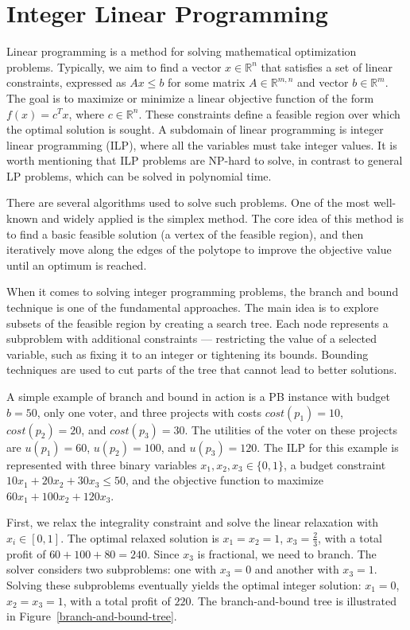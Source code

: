 \documentclass[magisterska,en]{pracamgr}
\begin{document}
\section{Integer Linear Programming}

Linear programming is a method for solving mathematical optimization problems. Typically, we aim to find a vector $x\in\mathbb{R}^n$ that satisfies a set of linear constraints, expressed as $Ax\leq b$ for some matrix $A\in\mathbb{R}^{m,n}$ and vector $b\in\mathbb{R}^m$. The goal is to maximize or minimize a linear objective function of the form $f(x)=c^Tx$, where $c\in\mathbb{R}^n$. These constraints define a feasible region over which the optimal solution is sought. A subdomain of linear programming is integer linear programming (ILP), where all the variables must take integer values. It is worth mentioning that ILP problems are NP-hard to solve, in contrast to general LP problems, which can be solved in polynomial time.

There are several algorithms used to solve such problems. One of the most well-known and widely applied is the simplex method. The core idea of this method is to find a basic feasible solution (a vertex of the feasible region), and then iteratively move along the edges of the polytope to improve the objective value until an optimum is reached.

When it comes to solving integer programming problems, the branch and bound technique is one of the fundamental approaches. The main idea is to explore subsets of the feasible region by creating a search tree. Each node represents a subproblem with additional constraints --- restricting the value of a selected variable, such as fixing it to an integer or tightening its bounds. Bounding techniques are used to cut parts of the tree that cannot lead to better solutions.

A simple example of branch and bound in action is a PB instance with budget $b=50$, only one voter, and three projects with costs $cost(p_1)=10$, $cost(p_2)=20$, and $cost(p_3)=30$. The utilities of the voter on these projects are $u(p_1)=60$, $u(p_2)=100$, and $u(p_3)=120$. The ILP for this example is represented with three binary variables $x_1,x_2,x_3\in\{0,1\}$, a budget constraint $10x_1+20x_2+30x_3\leq50$, and the objective function to maximize $60x_1+100x_2+120x_3$.

First, we relax the integrality constraint and solve the linear relaxation with $x_i\in[0,1]$. The optimal relaxed solution is $x_1=x_2=1$, $x_3=\frac{2}{3}$, with a total profit of $60+100+80=240$. Since $x_3$ is fractional, we need to branch. The solver considers two subproblems: one with $x_3=0$ and another with $x_3=1$. Solving these subproblems eventually yields the optimal integer solution: $x_1=0$, $x_2=x_3=1$, with a total profit of $220$. The branch-and-bound tree is illustrated in Figure~\ref{branch-and-bound-tree}.
\end{document}
